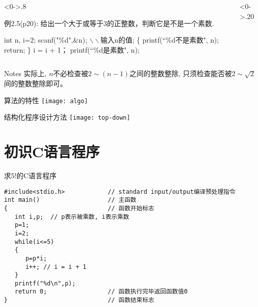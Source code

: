 \begin{frame}%
\begin{columns}%
	\begin{column}<0->{.8\textwidth}
		\begin{algorithm}[H]  
			\caption{例2.5(p20): 给出一个大于或等于3的正整数，判断它是不是一个素数.} %
			\begin{algorithmic}[1] %
				\State int n, i=2;
				\State scanf("\%d",\&n); $\backslash\backslash$输入n的值; 
				 \{ printf(``\%d不是素数", n); return; \}
				\EndIf
				\State i = i + 1；
				\EndWhile
				\State printf(``\%d是素数", n);	
			\end{algorithmic}  
		\end{algorithm}
	\end{column}%
	\begin{column}<0->{.20\textwidth}
		\newline
		\newline
	\end{column}%
\end{columns}
\begin{block}{Notes}
	实际上, $n$不必检查被$2\sim(n-1)$之间的整数整除, 只须检查能否被$2\sim\sqrt{2}$间的整数整除即可。
\end{block}
\end{frame}

\begin{frame}{算法的特性}
\texttt{[image: algo]}
\end{frame}

\begin{frame}{结构化程序设计方法}
\texttt{[image: top-down]}
\end{frame}

\section{初识C语言程序}

\begin{frame}[fragile]{求5!的C语言程序}
\begin{lstlisting}
#include<stdio.h>            // standard input/output编译预处理指令
int main()                   // 主函数
{                            // 函数开始标志
   int i,p;  // p表示被乘数, i表示乘数
   p=1;
   i=2;
   while(i<=5)
   {  
      p=p*i;
      i++; // i = i + 1
   }
   printf("%d\n",p);
   return 0;                 // 函数执行完毕返回函数值0
}                            // 函数结束标志
\end{lstlisting}
\end{frame}

